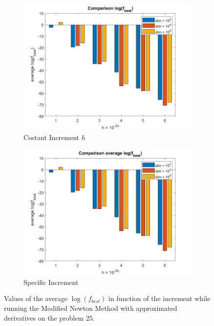 \begin{figure}[htbp]
    \centering
    \begin{subfigure}[t]{0.45\textwidth}  %
        \centering
        \includegraphics[width=\textwidth]{img/pb25_MN_difffinite_COST_log(fbest).png}
        \caption{Costant Increment $h$}
    \end{subfigure}
    \hspace{1cm} %
    \begin{subfigure}[t]{0.45\textwidth}
        \centering
        \includegraphics[width=\textwidth]{img/pb25_MN_difffinite_REL_log(fbest).png}
        \caption{Specific Increment }
    \end{subfigure}
    \caption{ \small Values of the average $\log(f_{best})$ in function of the increment while running the Modified Newton Method with approximated derivatives on the problem $25$.}
    \label{logfbest_difffinite25}
\end{figure}

